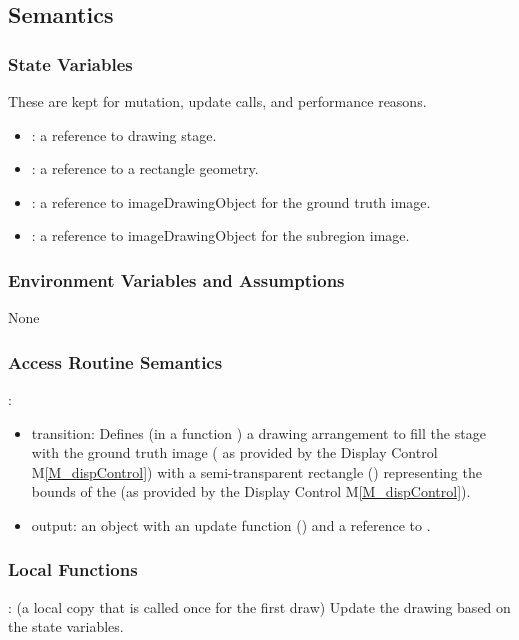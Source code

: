\documentclass[12pt, titlepage]{article}
\newcommand{\mref}[1]{M\ref{#1}}
\begin{document}
\subsection{Semantics}

\subsubsection{State Variables}
These are kept for mutation, update calls, and performance reasons.
\begin{itemize}
  \item {}: a reference to drawing stage.
  \item {}: a reference to a rectangle geometry.
  \item {}: a reference to imageDrawingObject for the ground truth image.
  \item {}: a reference to imageDrawingObject for the subregion image.
\end{itemize}

\subsubsection{Environment Variables and Assumptions}
None

\subsubsection{Access Routine Semantics}

\noindent {}:
\begin{itemize}
\item transition: Defines (in a function ) a drawing arrangement to fill the stage with the ground truth image
  ( as provided by the Display Control \mref{M_dispControl})
  with a semi-transparent rectangle () representing the bounds of the
   (as provided by the Display Control \mref{M_dispControl}).
\item output: an object with an update function () and a reference to .
\end{itemize}

\subsubsection{Local Functions}
: (a local copy that is called once for the first draw)
  Update the drawing based on the state variables.
\end{document}
